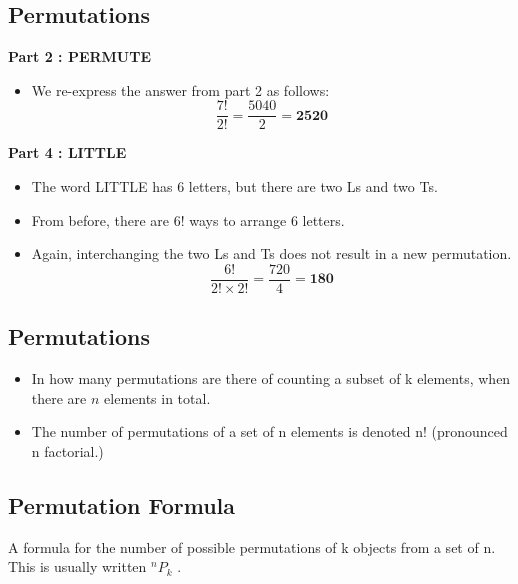 \documentclass[12pt]{report}
\begin{document}
		
		\subsection{Permutations}
		\Large
		\vspace{-2.3cm}
		\textbf{Part 2 : PERMUTE}\\
		\begin{itemize}
			\item We re-express the answer from part 2 as follows:
			\LARGE
			\[\frac{7!}{2!} =  \frac{5040}{2} = \boldsymbol{2520} \]
		\end{itemize}
		
		\textbf{Part 4 : LITTLE}\\
		\begin{itemize}
			\item The word LITTLE has 6 letters, but there are two Ls and two Ts.
			\item From before, there are 6! ways to arrange 6 letters.
			\item Again, interchanging the two Ls and Ts does not result in a new permutation. 
			\LARGE
			\[\frac{6!}{2!\times 2!} =  \frac{720}{4} = \boldsymbol{180} \]
		\end{itemize}
		
		
		\subsection{Permutations}
		\large
		\begin{itemize}
			\item In how many permutations are there of counting a subset of k elements, when there are $n$ elements in total.
			
			\item The number of permutations of a set of n elements is denoted n! (pronounced n factorial.)
		\end{itemize}
		
		
		\subsection{Permutation Formula}
		
		A formula for the number of possible permutations of k objects from a set of n. This is usually written $^nP_k$ .
		
\end{document}
